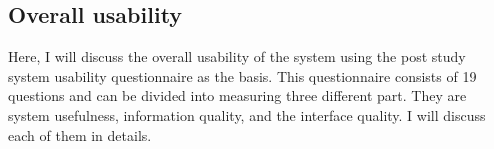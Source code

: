 \subsection{Overall usability}


Here, I will discuss the overall usability of the system using the post study system usability questionnaire as the basis. This questionnaire consists of 19 questions and can be divided into measuring three different part. They are system usefulness, information quality, and the interface quality. I will discuss each of them in details.

\begin{center}
\label{table:overall-usability}
\scalebox{0.75}{

}
\end{center}
